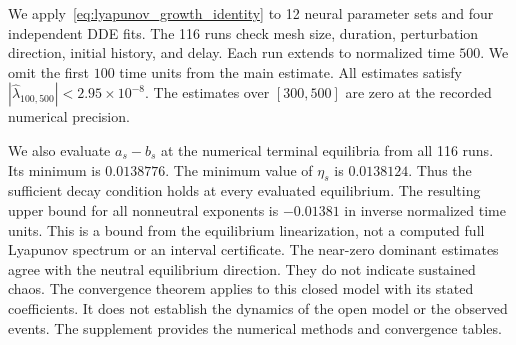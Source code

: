 We apply~\eqref{eq:lyapunov_growth_identity} to 12 neural parameter sets
and four independent DDE fits.
The 116 runs check mesh size, duration, perturbation direction,
initial history, and delay.
Each run extends to normalized time $500$.
We omit the first $100$ time units from the main estimate.
All estimates satisfy $|\widehat\lambda_{100,500}|<2.95\times10^{-8}$.
The estimates over $[300,500]$ are zero at the recorded numerical precision.

We also evaluate $a_s-b_s$ at the numerical terminal equilibria
from all 116 runs.
Its minimum is $0.0138776$.
The minimum value of $\eta_s$ is $0.0138124$.
Thus the sufficient decay condition holds at every evaluated equilibrium.
The resulting upper bound for all nonneutral exponents is
$-0.01381$ in inverse normalized time units.
This is a bound from the equilibrium linearization, not a computed
full Lyapunov spectrum or an interval certificate.
The near-zero dominant estimates agree with the neutral equilibrium direction.
They do not indicate sustained chaos.
The convergence theorem applies to this closed model with its stated coefficients.
It does not establish the dynamics of the open model or the observed events.
The supplement provides the numerical methods and convergence tables.
\endgroup
